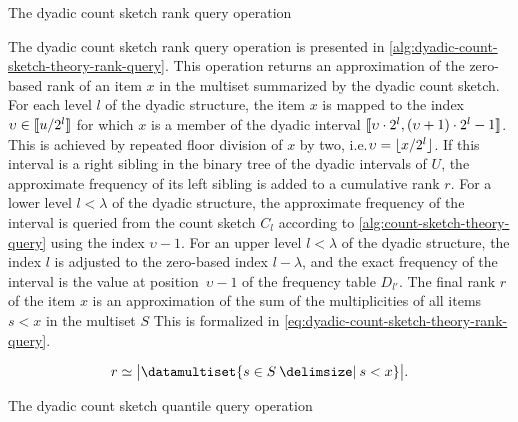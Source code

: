 \begin{algorithm}
  \caption{The dyadic count sketch rank query operation}
  \label{alg:dyadic-count-sketch-theory-rank-query}
  
\end{algorithm}

The dyadic count sketch rank query operation is presented in \cref{alg:dyadic-count-sketch-theory-rank-query}.
This operation returns an approximation of the zero-based rank of an item \( x \) in the multiset summarized by the dyadic count sketch.
For each level \( l \) of the dyadic structure, the item \( x \) is mapped to the index \( \upsilon \in \llbracket u / 2^{l}\rrbracket \) for which \( x \) is a member of the dyadic interval \( \llbracket\upsilon \cdot 2^{l}, (\upsilon + 1) \cdot 2^{l} - 1\rrbracket \).
This is achieved by repeated floor division of \( x \) by two, i.e.\@ \( \upsilon = \lfloor x / 2^{l}\rfloor \).
If this interval is a right sibling in the binary tree of the dyadic intervals of \( U \), the approximate frequency of its left sibling is added to a cumulative rank \( r \).
For a lower level \( l < \lambda \) of the dyadic structure, the approximate frequency of the interval is queried from the count sketch \( C_{l} \) according to \cref{alg:count-sketch-theory-query} using the index \( \upsilon - 1 \).
For an upper level \( l < \lambda \) of the dyadic structure, the index \( l \) is adjusted to the zero-based index \( l - \lambda \), and the exact frequency of the interval is the value at position~\( \upsilon - 1 \) of the frequency table \( D_{l'} \).
The final rank \( r \) of the item \( x \) is an approximation of the sum of the multiplicities of all items \( s < x \) in the multiset \( S \)
This is formalized in \cref{eq:dyadic-count-sketch-theory-rank-query}.

\begin{equation}
  \label{eq:dyadic-count-sketch-theory-rank-query}
  r \simeq \cardinality[\big]{\datamultiset{s \in S \suchthat s < x}}.
\end{equation}

\begin{algorithm}
  \caption{The dyadic count sketch quantile query operation}
  \label{alg:dyadic-count-sketch-theory-quantile-query}
  
\end{algorithm}

